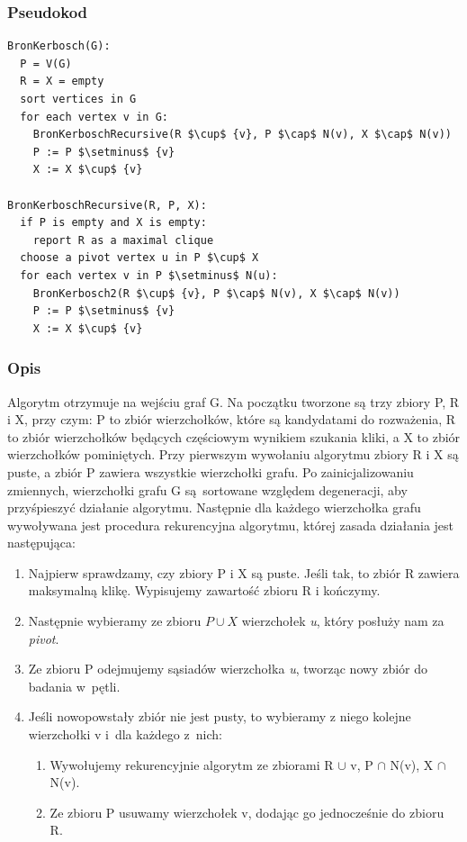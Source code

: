 \documentclass[11pt,a4paper]{article}
\begin{document}
\subsubsection{Pseudokod}
\begin{lstlisting}[mathescape = true, caption = Pseudokod algorytmu Brona-Kerboscha]
BronKerbosch(G):
  P = V(G)
  R = X = empty
  sort vertices in G
  for each vertex v in G:
    BronKerboschRecursive(R $\cup$ {v}, P $\cap$ N(v), X $\cap$ N(v))
    P := P $\setminus$ {v}
    X := X $\cup$ {v}

BronKerboschRecursive(R, P, X):
  if P is empty and X is empty:
    report R as a maximal clique
  choose a pivot vertex u in P $\cup$ X
  for each vertex v in P $\setminus$ N(u):
    BronKerbosch2(R $\cup$ {v}, P $\cap$ N(v), X $\cap$ N(v))
    P := P $\setminus$ {v}
    X := X $\cup$ {v}
\end{lstlisting}

\subsubsection{Opis}
Algorytm otrzymuje na wejściu graf G. Na początku tworzone są trzy zbiory P, R i X, przy czym: P to zbiór wierzchołków, które są kandydatami do rozważenia, R to zbiór wierzchołków będących częściowym wynikiem szukania kliki, a X to zbiór wierzchołków pominiętych. Przy pierwszym wywołaniu algorytmu zbiory R i X są puste, a zbiór P zawiera wszystkie wierzchołki grafu. Po zainicjalizowaniu zmiennych, wierzchołki grafu G są sortowane względem degeneracji, aby przyśpieszyć działanie algorytmu. Następnie dla każdego wierzchołka grafu wywoływana jest procedura rekurencyjna algorytmu, której zasada działania jest następująca:

\begin{enumerate}
  \item Najpierw sprawdzamy, czy zbiory P i X są puste. Jeśli tak, to zbiór R zawiera maksymalną klikę. Wypisujemy zawartość zbioru R i kończymy.
  \item Następnie wybieramy ze zbioru $P \cup X$ wierzchołek \textit{u}, który posłuży nam za \textit{pivot}.
  \item Ze zbioru P odejmujemy sąsiadów wierzchołka \textit{u}, tworząc nowy zbiór do badania w~pętli.
  \item Jeśli nowopowstały zbiór nie jest pusty, to wybieramy z niego kolejne wierzchołki v i~dla każdego z~nich:
    \begin{enumerate}
      \item Wywołujemy rekurencyjnie algorytm ze zbiorami R $\cup$ {v}, P $\cap$ N(v), X $\cap$ N(v).
      \item Ze zbioru P usuwamy wierzchołek v, dodając go jednocześnie do zbioru R.
    \end{enumerate}
\end{enumerate}
\end{document}
